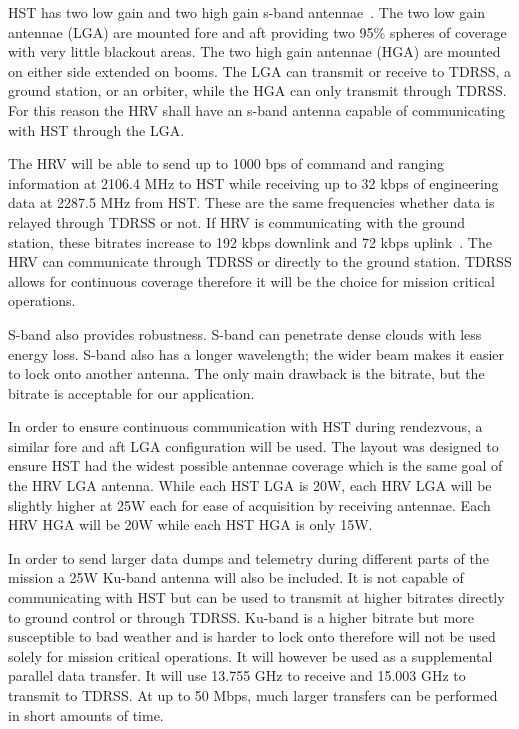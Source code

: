 \documentclass[paper=letter, fontsize=11pt]{scrartcl} %
\numberwithin{equation}{section} %
\numberwithin{figure}{section} %
\numberwithin{table}{section} %
\begin{document}
HST has two low gain and two high gain s-band antennae~\cite{csm}. The two low gain antennae (LGA) are mounted fore and aft providing two 95\% spheres of coverage with very little blackout areas. The two high gain antennae (HGA) are mounted on either side extended on booms. The LGA can transmit or receive to TDRSS, a ground station, or an orbiter, while the HGA can only transmit through TDRSS. For this reason the HRV shall have an s-band antenna capable of communicating with HST through the LGA.

The HRV will be able to send up to 1000 bps of command and ranging information at 2106.4 MHz to HST while receiving up to 32 kbps of engineering data at 2287.5 MHz from HST. These are the same frequencies whether data is relayed through TDRSS or not. If HRV is communicating with the ground station, these bitrates increase to 192 kbps downlink and 72 kbps uplink~\cite{usa2010european}. The HRV can communicate through TDRSS or directly to the ground station. TDRSS allows for continuous coverage therefore it will be the choice for mission critical operations.

S-band also provides robustness. S-band can penetrate dense clouds with less energy loss. S-band also has a longer wavelength; the wider beam makes it easier to lock onto another antenna. The only main drawback is the bitrate, but the bitrate is acceptable for our application.

In order to ensure continuous communication with HST during rendezvous, a similar fore and aft LGA configuration will be used. The layout was designed to ensure HST had the widest possible antennae coverage which is the same goal of the HRV LGA antenna. While each HST LGA is 20W, each HRV LGA will be slightly higher at 25W each for ease of acquisition by receiving antennae. Each HRV HGA will be 20W while each HST HGA is only 15W.

In order to send larger data dumps and telemetry during different parts of the mission a 25W Ku-band antenna will also be included. It is not capable of communicating with HST but can be used to transmit at higher bitrates directly to ground control or through TDRSS. Ku-band is a higher bitrate but more susceptible to bad weather and is harder to lock onto therefore will not be used solely for mission critical operations. It will however be used as a supplemental parallel data transfer. It will use 13.755 GHz to receive and 15.003 GHz to transmit to TDRSS. At up to 50 Mbps, much larger transfers can be performed in short amounts of time.
\end{document}
